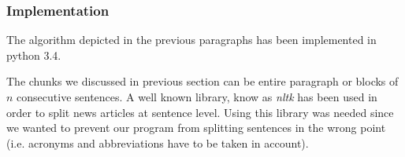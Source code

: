 \subsubsection*{Implementation}
The algorithm depicted in the previous paragraphs has been implemented in python 3.4.

The chunks we discussed in previous section can be entire paragraph or blocks of
$n$ consecutive sentences. A well known library, know as \emph{nltk}\cite{nltk} has been used in order to
split news articles at sentence level. Using this library was needed since we wanted
to prevent our program from splitting sentences in the wrong point (i.e.
acronyms and abbreviations have to be taken in account).

